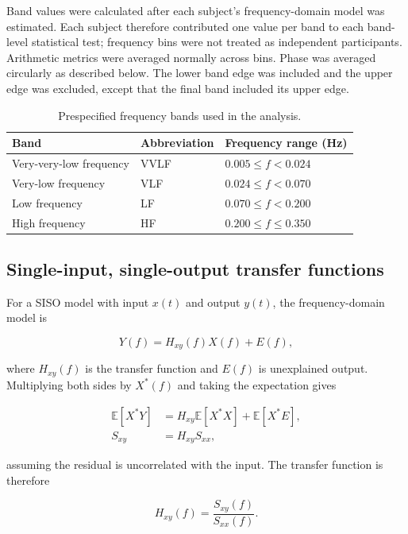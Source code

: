 \documentclass[12pt]{article}
\begin{document}
Band values were calculated after each subject's frequency-domain model was
estimated. Each subject therefore contributed one value per band to each
band-level statistical test; frequency bins were not treated as independent
participants. Arithmetic metrics were averaged normally across bins. Phase
was averaged circularly as described below. The lower band edge was included
and the upper edge was excluded, except that the final band included its upper
edge.

\begin{table}[H]
\centering
\caption{Prespecified frequency bands used in the analysis.}
\label{tab:bands}
\begin{tabular}{lll}
\toprule
Band & Abbreviation & Frequency range (Hz) \\
\midrule
Very-very-low frequency & VVLF & $0.005 \leq f < 0.024$ \\
Very-low frequency & VLF & $0.024 \leq f < 0.070$ \\
Low frequency & LF & $0.070 \leq f < 0.200$ \\
High frequency & HF & $0.200 \leq f \leq 0.350$ \\
\bottomrule
\end{tabular}
\end{table}

\subsection{Single-input, single-output transfer functions}

For a SISO model with input $x(t)$ and output $y(t)$, the frequency-domain
model is

\begin{equation}
    Y(f)=H_{xy}(f)X(f)+E(f),
    \label{eq:siso_model}
\end{equation}

where $H_{xy}(f)$ is the transfer function and $E(f)$ is unexplained output.
Multiplying both sides by $X^*(f)$ and taking the expectation gives

\begin{align}
    \mathbb{E}[X^*Y]
    &=H_{xy}\mathbb{E}[X^*X]+\mathbb{E}[X^*E],\\
    S_{xy}
    &=H_{xy}S_{xx},
\end{align}

assuming the residual is uncorrelated with the input. The transfer function
is therefore

\begin{equation}
    H_{xy}(f)=\frac{S_{xy}(f)}{S_{xx}(f)}.
    \label{eq:siso_transfer}
\end{equation}
\end{document}
